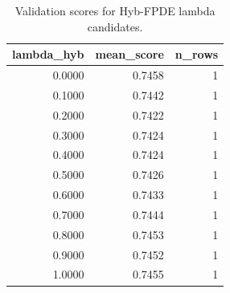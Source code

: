 \begin{table}[t]
\caption{Validation scores for Hyb-FPDE lambda candidates.}
\label{tab:lambda_distribution_computed}
\centering
\begin{tabular}{rrr}
\toprule
lambda\_hyb & mean\_score & n\_rows \\
\midrule
0.0000 & 0.7458 & 1 \\
0.1000 & 0.7442 & 1 \\
0.2000 & 0.7422 & 1 \\
0.3000 & 0.7424 & 1 \\
0.4000 & 0.7424 & 1 \\
0.5000 & 0.7426 & 1 \\
0.6000 & 0.7433 & 1 \\
0.7000 & 0.7444 & 1 \\
0.8000 & 0.7453 & 1 \\
0.9000 & 0.7452 & 1 \\
1.0000 & 0.7455 & 1 \\
\bottomrule
\end{tabular}

\end{table}
